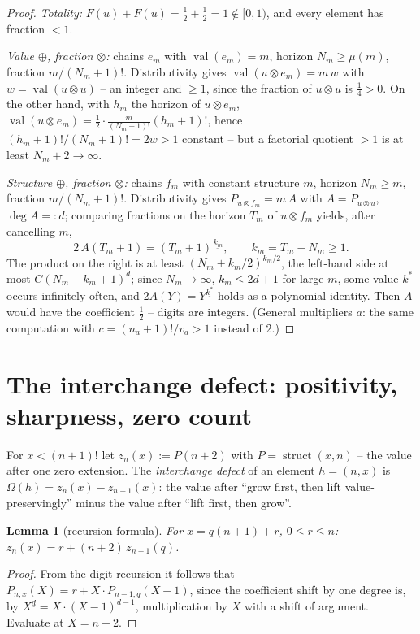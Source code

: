\documentclass[11pt]{article}
\newtheorem{lemma}[satz]{Lemma}
\theoremstyle{definition}
\theoremstyle{remark}
\newcommand{\val}{\operatorname{val}}
\newcommand{\ff}[2]{#1^{\underline{#2}}}
\begin{document}
\begin{proof}
\emph{Totality:} $F(u)+F(u)=\tfrac12+\tfrac12=1\notin[0,1)$, and
every element has fraction $<1$.

\emph{Value $\oplus$, fraction $\otimes$:} chains $e_m$ with
$\val(e_m)=m$, horizon $N_m\ge\mu(m)$, fraction $m/(N_m{+}1)!$.
Distributivity gives $\val(u\otimes e_m)=m\,w$ with
$w=\val(u\otimes u)$ -- an integer and $\ge1$, since the fraction
of $u\otimes u$ is $\tfrac14>0$. On the other hand, with $h_m$ the
horizon of $u\otimes e_m$,
$\val(u\otimes e_m)=\tfrac12\cdot\frac{m}{(N_m+1)!}(h_m{+}1)!$,
hence $(h_m{+}1)!/(N_m{+}1)!=2w>1$ constant -- but a
factorial quotient $>1$ is at least $N_m{+}2\to\infty$.

\emph{Structure $\oplus$, fraction $\otimes$:} chains $f_m$ with
constant structure $m$, horizon $N_m\ge m$, fraction
$m/(N_m{+}1)!$. Distributivity gives $P_{u\otimes f_m}=m\,A$ with
$A=P_{u\otimes u}$, $\deg A=:d$; comparing fractions on the
horizon $T_m$ of $u\otimes f_m$ yields, after cancelling $m$,
\[
2\,A(T_m{+}1)=(T_m{+}1)^{\underline{\,k_m}},\qquad
k_m=T_m-N_m\ge1 .
\]
The product on the right is at least $(N_m+k_m/2)^{k_m/2}$, the
left-hand side at most $C(N_m{+}k_m{+}1)^d$; since $N_m\to\infty$,
$k_m\le2d{+}1$ for large $m$, some value $k^*$ occurs infinitely
often, and $2A(Y)=Y^{\underline{k^*}}$ holds as a polynomial
identity. Then $A$ would have the coefficient $\tfrac12$ --
digits are integers. (General multipliers $a$: the same
computation with $c=(n_a{+}1)!/v_a>1$ instead of $2$.)
\end{proof}


\section{The interchange defect: positivity, sharpness, zero
count}\label{app:interchange}


For $x<(n{+}1)!$ let $z_n(x):=P(n{+}2)$ with
$P=\operatorname{struct}(x,n)$ -- the value after one zero
extension. The \emph{interchange defect} of an element
$h=(n,x)$ is
$\Omega(h)=z_n(x)-z_{n+1}(x)$: the value after ``grow first, then
lift value-preservingly'' minus the value after ``lift first, then
grow''.

\begin{lemma}[recursion formula]
For $x=q(n{+}1)+r$, $0\le r\le n$:
$z_n(x)=r+(n{+}2)\,z_{n-1}(q)$.
\end{lemma}

\begin{proof}
From the digit recursion it follows that
$P_{n,x}(X)=r+X\cdot P_{n-1,q}(X{-}1)$, since the coefficient
shift by one degree is, by
$\ff Xd=X\cdot\ff{(X{-}1)}{d-1}$, multiplication by $X$ with a
shift of argument. Evaluate at $X=n{+}2$.
\end{proof}
\end{document}
